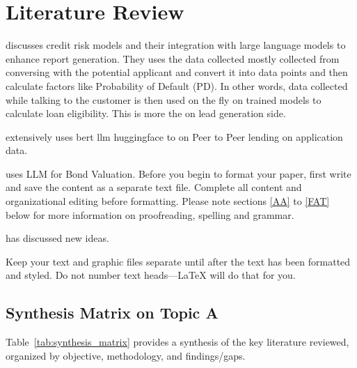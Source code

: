 \documentclass[conference]{IEEEtran}
\begin{document}
\section{Literature Review}


\textcite{teixeiraEnhancingCreditRisk2023} discusses credit risk models and their integration with large language models to enhance report generation. They uses the data collected mostly collected from conversing with the potential applicant and convert it into data points and then calculate factors like Probability of Default (PD). In other words, data collected while talking to the customer is then used on the fly on trained models to calculate loan eligibility. This is more the on lead generation side.

\textcite{sanz-guerreroCreditRiskMeets2024} extensively uses bert llm huggingface to on Peer to Peer lending on application data. 

\textcite{khojaAIBondValues2024} uses LLM for Bond Valuation. 
Before you begin to format your paper, first write and save the content as a 
separate text file. Complete all content and organizational editing before 
formatting. Please note sections \ref{AA} to \ref{FAT} below for more information on 
proofreading, spelling and grammar.


\textcite{babaeiGPTClassificationsApplication2024}  has discussed new ideas.

Keep your text and graphic files separate until after the text has been 
formatted and styled. Do not number text heads---{\LaTeX} will do that 
for you.

\subsection{Synthesis Matrix on Topic A}

Table~\ref{tab:synthesis_matrix} provides a synthesis of the key literature reviewed, organized by objective, methodology, and findings/gaps.
\end{document}
